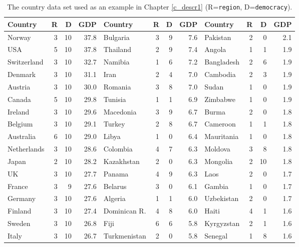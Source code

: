 \begin{table}
\caption{The country data set used as an example
in Chapter \ref{c_descr1} (R=\texttt{region}, D=\texttt{democracy}).}
\label{t_countrydata}
{\footnotesize
\begin{ttfamily}
\begin{tabular}{|lrrr|lrrr|lrrr|}\hline
Country & R & D & GDP &
Country & R & D & GDP &
Country & R & D & GDP \\  \hline
Norway        & 3 & 10 &37.8 &Bulgaria      & 3 &  9 & 7.6&Pakistan     &2& 0&  2.1\\
USA           & 5 & 10 &37.8 &Thailand      & 2 &  9 & 7.4&Angola       &1& 1&  1.9\\
Switzerland   & 3 & 10 &32.7 &Namibia       & 1 &  6 & 7.2&Bangladesh   &2& 6&  1.9\\
Denmark       & 3 & 10 &31.1 &Iran          & 2 &  4 & 7.0&Cambodia     &2& 3&  1.9\\
Austria       & 3 & 10 &30.0 &Romania       & 3 &  8 & 7.0&Sudan        &1& 0&  1.9\\
Canada        & 5 & 10 &29.8 &Tunisia       & 1 &  1 & 6.9&Zimbabwe     &1& 0&  1.9\\
Ireland       & 3 & 10 &29.6 &Macedonia     & 3 &  9 & 6.7&Burma        &2& 0&  1.8\\
Belgium       & 3 & 10 &29.1 &Turkey        & 2 &  8 & 6.7&Cameroon     &1& 1&  1.8\\
Australia     & 6 & 10 &29.0 &Libya         & 1 &  0 & 6.4&Mauritania   &1& 0&  1.8\\
Netherlands   & 3 & 10 &28.6 &Colombia      & 4 &  7 & 6.3&Moldova      &3& 8&  1.8\\
Japan         & 2 & 10 &28.2 &Kazakhstan    & 2 &  0 & 6.3&Mongolia     &2&10&  1.8\\
UK            & 3 & 10 &27.7 &Panama        & 4 &  9 & 6.3&Laos         &2& 0&  1.7\\
France        & 3 &  9 &27.6 &Belarus       & 3 &  0 & 6.1&Gambia       &1& 0&  1.7\\
Germany       & 3 & 10 &27.6 &Algeria       & 1 &  1 & 6.0&Uzbekistan   &2& 0&  1.7\\
Finland       & 3 & 10 &27.4 &Dominican R.  & 4 &  8 & 6.0&Haiti        &4& 1&  1.6\\
Sweden        & 3 & 10 &26.8 &Fiji          & 6 &  6 & 5.8&Kyrgyzstan   &2& 1&  1.6\\
Italy         & 3 & 10 &26.7 &Turkmenistan  & 2 &  0 & 5.8&Senegal      &1& 8&  1.6\\

\end{tabular}
\end{ttfamily}}
\end{table}
